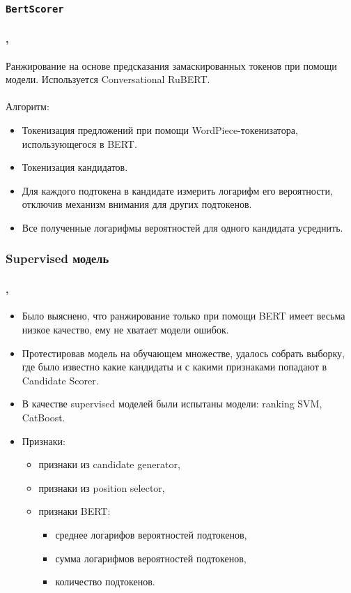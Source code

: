 \documentclass[t]{beamer}  %
\begin{document}
\subsubsection{\texttt{BertScorer}}
\begin{frame}
	\frametitle{\insertsection} 
	\framesubtitle{\insertsubsection, \insertsubsubsection}
	Ранжирование на основе предсказания замаскированных токенов при помощи модели. Используется Conversational RuBERT.\\~\\
	
	Алгоритм:
	\begin{itemize}
		\item Токенизация предложений при помощи WordPiece-токенизатора, использующегося в BERT.
		\item Токенизация кандидатов.
		\item Для каждого подтокена в кандидате измерить логарифм его вероятности, отключив механизм внимания для других подтокенов.
		\item Все полученные логарифмы вероятностей для одного кандидата усреднить.
	\end{itemize}
\end{frame}

\subsubsection{Supervised модель}
\begin{frame}
	\frametitle{\insertsection} 
	\framesubtitle{\insertsubsection, \insertsubsubsection}
	\begin{itemize}
		\item Было выяснено, что ранжирование только при помощи BERT имеет весьма низкое качество, ему не хватает модели ошибок.
		\item Протестировав модель на обучающем множестве, удалось собрать выборку, где было известно какие кандидаты и с какими признаками попадают в Candidate Scorer.
		\item В качестве supervised моделей были испытаны модели: ranking SVM, CatBoost.
		\item Признаки:
		\begin{itemize}
			\item признаки из candidate generator,
			\item признаки из position selector,
			\item признаки BERT:
			\begin{itemize}
				\item среднее логарифов вероятностей подтокенов,
				\item сумма логарифмов вероятностей подтокенов,
				\item количество подтокенов.
			\end{itemize}
		\end{itemize}
	\end{itemize}
\end{frame}
\end{document}
